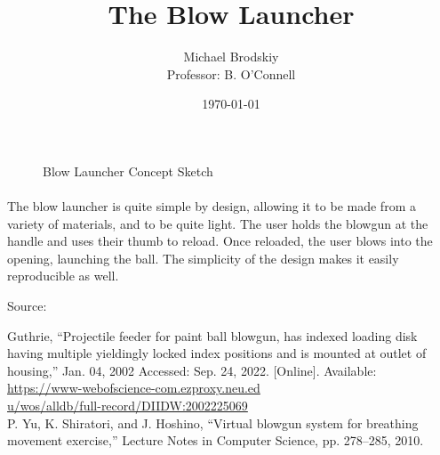 


\title{The Blow Launcher}
\date{\today}
\author{Michael Brodskiy\\ \small Professor: B. O'Connell}



\maketitle

\begin{figure}[h!]
  \centering
  
  \caption{Blow Launcher Concept Sketch}
  \label{fig:1}
\end{figure}

\paragraph{} The blow launcher is quite simple by design, allowing it to be made from a variety of materials, and to be quite light. The user holds the blowgun at the handle and uses their thumb to reload. Once reloaded, the user blows into the opening, launching the ball. The simplicity of the design makes it easily reproducible as well.

\newline
\vspace{25pt}

Source:

\text{[1]} Guthrie, “Projectile feeder for paint ball blowgun, has indexed loading disk having multiple yieldingly locked index positions and is mounted at outlet of housing,” Jan. 04, 2002 Accessed: Sep. 24, 2022. [Online]. Available: \href{https://www-webofscience-com.ezproxy.neu.edu/wos/alldb/full-record/DIIDW:2002225069}{https://www-webofscience-com.ezproxy.neu.ed\\u/wos/alldb/full-record/DIIDW:2002225069}\\
\text{[2]} P. Yu, K. Shiratori, and J. Hoshino, “Virtual blowgun system for breathing movement exercise,” Lecture Notes in Computer Science, pp. 278–285, 2010. 



